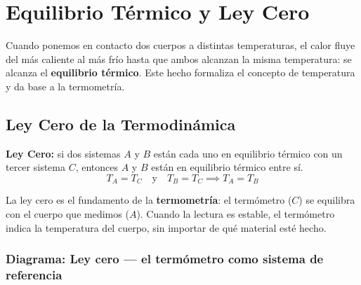 \section{Equilibrio Térmico y Ley Cero}

\begin{seccion}
Cuando ponemos en contacto dos cuerpos a distintas temperaturas, el calor fluye del más caliente al más frío hasta que ambos alcanzan la misma temperatura: se alcanza el \textbf{equilibrio térmico}. Este hecho formaliza el concepto de temperatura y da base a la termometría.
\end{seccion}

\subsection{Ley Cero de la Termodinámica}

\begin{seccion}
\begin{definicion}
\textbf{Ley Cero:} si dos sistemas $A$ y $B$ están cada uno en equilibrio térmico con un tercer sistema $C$, entonces $A$ y $B$ están en equilibrio térmico entre sí.
$$T_A = T_C \quad \text{y} \quad T_B = T_C \implies T_A = T_B$$
\end{definicion}

\begin{nota}
La ley cero es el fundamento de la \textbf{termometría}: el termómetro ($C$) se equilibra con el cuerpo que medimos ($A$). Cuando la lectura es estable, el termómetro indica la temperatura del cuerpo, sin importar de qué material esté hecho.
\end{nota}
\end{seccion}

\subsubsection{Diagrama: Ley cero --- el termómetro como sistema de referencia}

